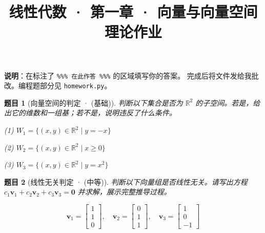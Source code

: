 \documentclass[12pt]{ctexart}
\title{线性代数 · 第一章 · 向量与向量空间 \\ 理论作业}
\author{}
\date{}
\newtheorem{problem}{题目}
\begin{document}
\maketitle

\begin{center}
\textbf{说明}：在标注了 \texttt{\%\%\% 在此作答 \%\%\%} 的区域填写你的答案。
完成后将文件发给我批改。编程题部分见 \texttt{homework.py}。
\end{center}

\begin{problem}[向量空间的判定 · (基础)]
判断以下集合是否为 $\mathbb{R}^2$ 的子空间。若是，给出它的维数和一组基；若不是，说明违反了什么条件。

(1) $W_1 = \{(x, y) \in \mathbb{R}^2 \mid y = -x\}$

(2) $W_2 = \{(x, y) \in \mathbb{R}^2 \mid x \geq 0\}$

(3) $W_3 = \{(x, y) \in \mathbb{R}^2 \mid y = x^2\}$
\end{problem}










\begin{problem}[线性无关判定 · (中等)]
判断以下向量组是否线性无关。请写出方程 $c_1\mathbf{v}_1 + c_2\mathbf{v}_2 + c_3\mathbf{v}_3 = \mathbf{0}$ 并求解，展示完整推导过程。

\[
\mathbf{v}_1 = \begin{bmatrix} 1 \\ 1 \\ 0 \end{bmatrix},\quad
\mathbf{v}_2 = \begin{bmatrix} 0 \\ 1 \\ 1 \end{bmatrix},\quad
\mathbf{v}_3 = \begin{bmatrix} 1 \\ 0 \\ -1 \end{bmatrix}
\]

\end{problem}

\end{document}
